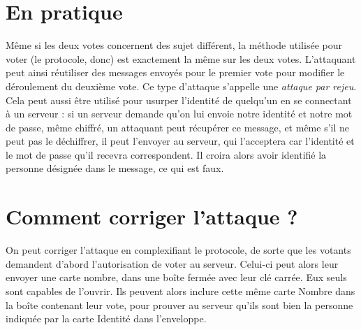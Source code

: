 \documentclass[a4paper,10pt]{article}
\begin{document}
\section{En pratique}
Même si les deux votes concernent des sujet différent, la méthode utilisée pour voter (le protocole, donc) est exactement la même sur les deux votes. L'attaquant peut ainsi réutiliser des messages envoyés pour le premier vote pour modifier le déroulement du deuxième vote. Ce type d'attaque s'appelle une \emph{attaque par rejeu}. Cela peut aussi être utilisé pour usurper l'identité de quelqu'un en se connectant à un serveur : si un serveur demande qu'on lui envoie notre identité et notre mot de passe, même chiffré, un attaquant peut récupérer ce message, et même s'il ne peut pas le déchiffrer, il peut l'envoyer au serveur, qui l'acceptera car l'identité et le mot de passe qu'il recevra correspondent. Il croira alors avoir identifié la personne désignée dans le message, ce qui est faux.


\section{Comment corriger l'attaque ?}
On peut corriger l'attaque en complexifiant le protocole, de sorte que les votants demandent d'abord l'autorisation de voter au serveur. Celui-ci peut alors leur envoyer une carte nombre, dans une boîte fermée avec leur clé carrée. Eux seuls sont capables de l'ouvrir. Ils peuvent alors inclure cette même carte Nombre dans la boîte contenant leur vote, pour prouver au serveur qu'ils sont bien la personne indiquée par la carte Identité dans l'enveloppe.
\end{document}
